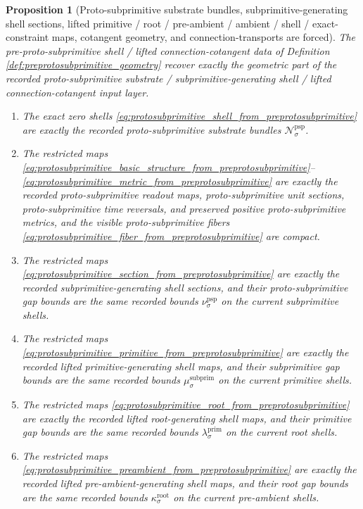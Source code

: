 \documentclass[11pt]{article}
\newcommand{\RootGap}[1]{\kappa_{#1}^{\mathrm{root}}}
\newcommand{\PrimGap}[1]{\lambda_{#1}^{\mathrm{prim}}}
\newcommand{\SubprimGap}[1]{\mu_{#1}^{\mathrm{subprim}}}
\newcommand{\ProtoSubprimGap}[1]{\nu_{#1}^{\mathrm{psp}}}
\newcommand{\ProtoSubprimSpace}[1]{\mathcal N_{#1}^{\mathrm{psp}}}
\newtheorem{proposition}{Proposition}
\begin{document}
\begin{proposition}[Proto-subprimitive substrate bundles, subprimitive-generating shell sections, lifted primitive / root / pre-ambient / ambient / shell / exact-constraint maps, cotangent geometry, and connection-transports are forced]
\label{prop:protosubprimitive_geometry_forced}
The pre-proto-subprimitive shell / lifted connection-cotangent data of Definition \ref{def:preprotosubprimitive_geometry} recover exactly the geometric part of the recorded proto-subprimitive substrate / subprimitive-generating shell / lifted connection-cotangent input layer.
\begin{enumerate}
    \item The exact zero shells \eqref{eq:protosubprimitive_shell_from_preprotosubprimitive} are exactly the recorded proto-subprimitive substrate bundles \(\ProtoSubprimSpace{\sigma}\).
    \item The restricted maps \eqref{eq:protosubprimitive_basic_structure_from_preprotosubprimitive}--\eqref{eq:protosubprimitive_metric_from_preprotosubprimitive} are exactly the recorded proto-subprimitive readout maps, proto-subprimitive unit sections, proto-subprimitive time reversals, and preserved positive proto-subprimitive metrics, and the visible proto-subprimitive fibers \eqref{eq:protosubprimitive_fiber_from_preprotosubprimitive} are compact.
    \item The restricted maps \eqref{eq:protosubprimitive_section_from_preprotosubprimitive} are exactly the recorded subprimitive-generating shell sections, and their proto-subprimitive gap bounds are the same recorded bounds \(\ProtoSubprimGap{\sigma}\) on the current subprimitive shells.
    \item The restricted maps \eqref{eq:protosubprimitive_primitive_from_preprotosubprimitive} are exactly the recorded lifted primitive-generating shell maps, and their subprimitive gap bounds are the same recorded bounds \(\SubprimGap{\sigma}\) on the current primitive shells.
    \item The restricted maps \eqref{eq:protosubprimitive_root_from_preprotosubprimitive} are exactly the recorded lifted root-generating shell maps, and their primitive gap bounds are the same recorded bounds \(\PrimGap{\sigma}\) on the current root shells.
    \item The restricted maps \eqref{eq:protosubprimitive_preambient_from_preprotosubprimitive} are exactly the recorded lifted pre-ambient-generating shell maps, and their root gap bounds are the same recorded bounds \(\RootGap{\sigma}\) on the current pre-ambient shells.

\end{enumerate}
\end{proposition}
\end{document}
